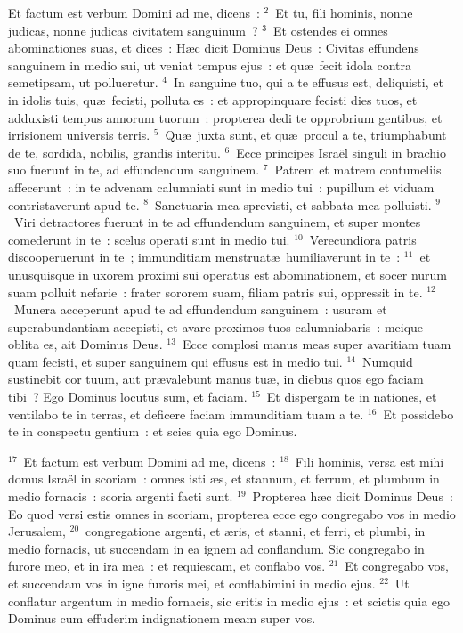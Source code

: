 \lettrine[lines=10,image=true,loversize=0.05,lraise=-0.03]{E}{}t factum est verbum Domini ad me, dicens~:
${}^{2}$~Et tu, fili hominis, nonne judicas, nonne judicas civitatem sanguinum~?
${}^{3}$~Et ostendes ei omnes abominationes suas, et dices~: H\ae c dicit Dominus Deus~: Civitas effundens sanguinem in medio sui, ut veniat tempus ejus~: et qu\ae\ fecit idola contra semetipsam, ut pollueretur.
${}^{4}$~In sanguine tuo, qui a te effusus est, deliquisti, et in idolis tuis, qu\ae\ fecisti, polluta es~: et appropinquare fecisti dies tuos, et adduxisti tempus annorum tuorum~: propterea dedi te opprobrium gentibus, et irrisionem universis terris.
${}^{5}$~Qu\ae\ juxta sunt, et qu\ae\ procul a te, triumphabunt de te, sordida, nobilis, grandis interitu.
${}^{6}$~Ecce principes Isra\"el singuli in brachio suo fuerunt in te, ad effundendum sanguinem.
${}^{7}$~Patrem et matrem contumeliis affecerunt~: in te advenam calumniati sunt in medio tui~: pupillum et viduam contristaverunt apud te.
${}^{8}$~Sanctuaria mea sprevisti, et sabbata mea polluisti.
${}^{9}$~Viri detractores fuerunt in te ad effundendum sanguinem, et super montes comederunt in te~: scelus operati sunt in medio tui.
${}^{10}$~Verecundiora patris discooperuerunt in te~; immunditiam menstruat\ae\ humiliaverunt in te~:
${}^{11}$~et unusquisque in uxorem proximi sui operatus est abominationem, et socer nurum suam polluit nefarie~: frater sororem suam, filiam patris sui, oppressit in te.
${}^{12}$~Munera acceperunt apud te ad effundendum sanguinem~: usuram et superabundantiam accepisti, et avare proximos tuos calumniabaris~: meique oblita es, ait Dominus Deus.
${}^{13}$~Ecce complosi manus meas super avaritiam tuam quam fecisti, et super sanguinem qui effusus est in medio tui.
${}^{14}$~Numquid sustinebit cor tuum, aut pr\ae valebunt manus tu\ae , in diebus quos ego faciam tibi~? Ego Dominus locutus sum, et faciam.
${}^{15}$~Et dispergam te in nationes, et ventilabo te in terras, et deficere faciam immunditiam tuam a te.
${}^{16}$~Et possidebo te in conspectu gentium~: et scies quia ego Dominus.


${}^{17}$~Et factum est verbum Domini ad me, dicens~:
${}^{18}$~Fili hominis, versa est mihi domus Isra\"el in scoriam~: omnes isti \ae s, et stannum, et ferrum, et plumbum in medio fornacis~: scoria argenti facti sunt.
${}^{19}$~Propterea h\ae c dicit Dominus Deus~: Eo quod versi estis omnes in scoriam, propterea ecce ego congregabo vos in medio Jerusalem,
${}^{20}$~congregatione argenti, et \ae ris, et stanni, et ferri, et plumbi, in medio fornacis, ut succendam in ea ignem ad conflandum. Sic congregabo in furore meo, et in ira mea~: et requiescam, et conflabo vos.
${}^{21}$~Et congregabo vos, et succendam vos in igne furoris mei, et conflabimini in medio ejus.
${}^{22}$~Ut conflatur argentum in medio fornacis, sic eritis in medio ejus~: et scietis quia ego Dominus cum effuderim indignationem meam super vos.


